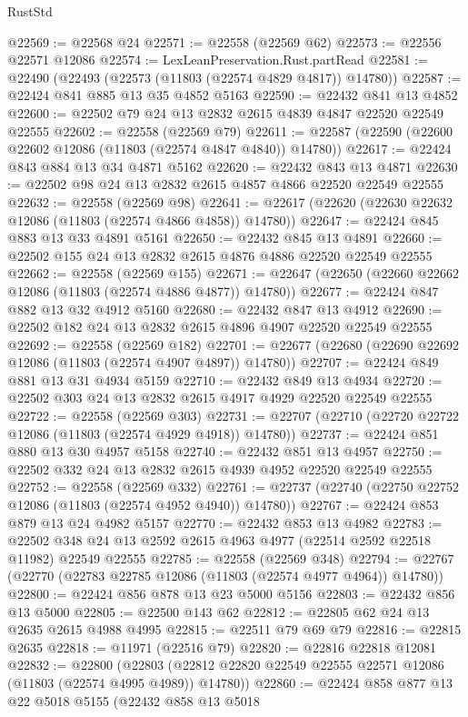\begin{lexlean}{RustStd}
\begin{coremodule}
@22569 := @22568 @24
@22571 := @22558 (@22569 @62)
@22573 := @22556 @22571 @12086
@22574 := LexLeanPreservation.Rust.partRead
@22581 := @22490 (@22493 (@22573 (@11803 (@22574 @4829 @4817)) @14780))
@22587 := @22424 @841 @885 @13 @35 @4852 @5163
@22590 := @22432 @841 @13 @4852
@22600 := @22502 @79 @24 @13 @2832 @2615 @4839 @4847 @22520 @22549 @22555
@22602 := @22558 (@22569 @79)
@22611 := @22587 (@22590 (@22600 @22602 @12086 (@11803 (@22574 @4847 @4840)) @14780))
@22617 := @22424 @843 @884 @13 @34 @4871 @5162
@22620 := @22432 @843 @13 @4871
@22630 := @22502 @98 @24 @13 @2832 @2615 @4857 @4866 @22520 @22549 @22555
@22632 := @22558 (@22569 @98)
@22641 := @22617 (@22620 (@22630 @22632 @12086 (@11803 (@22574 @4866 @4858)) @14780))
@22647 := @22424 @845 @883 @13 @33 @4891 @5161
@22650 := @22432 @845 @13 @4891
@22660 := @22502 @155 @24 @13 @2832 @2615 @4876 @4886 @22520 @22549 @22555
@22662 := @22558 (@22569 @155)
@22671 := @22647 (@22650 (@22660 @22662 @12086 (@11803 (@22574 @4886 @4877)) @14780))
@22677 := @22424 @847 @882 @13 @32 @4912 @5160
@22680 := @22432 @847 @13 @4912
@22690 := @22502 @182 @24 @13 @2832 @2615 @4896 @4907 @22520 @22549 @22555
@22692 := @22558 (@22569 @182)
@22701 := @22677 (@22680 (@22690 @22692 @12086 (@11803 (@22574 @4907 @4897)) @14780))
@22707 := @22424 @849 @881 @13 @31 @4934 @5159
@22710 := @22432 @849 @13 @4934
@22720 := @22502 @303 @24 @13 @2832 @2615 @4917 @4929 @22520 @22549 @22555
@22722 := @22558 (@22569 @303)
@22731 := @22707 (@22710 (@22720 @22722 @12086 (@11803 (@22574 @4929 @4918)) @14780))
@22737 := @22424 @851 @880 @13 @30 @4957 @5158
@22740 := @22432 @851 @13 @4957
@22750 := @22502 @332 @24 @13 @2832 @2615 @4939 @4952 @22520 @22549 @22555
@22752 := @22558 (@22569 @332)
@22761 := @22737 (@22740 (@22750 @22752 @12086 (@11803 (@22574 @4952 @4940)) @14780))
@22767 := @22424 @853 @879 @13 @24 @4982 @5157
@22770 := @22432 @853 @13 @4982
@22783 := @22502 @348 @24 @13 @2592 @2615 @4963 @4977 (@22514 @2592 @22518 @11982) @22549 @22555
@22785 := @22558 (@22569 @348)
@22794 := @22767 (@22770 (@22783 @22785 @12086 (@11803 (@22574 @4977 @4964)) @14780))
@22800 := @22424 @856 @878 @13 @23 @5000 @5156
@22803 := @22432 @856 @13 @5000
@22805 := @22500 @143 @62
@22812 := @22805 @62 @24 @13 @2635 @2615 @4988 @4995
@22815 := @22511 @79 @69 @79
@22816 := @22815 @2635
@22818 := @11971 (@22516 @79)
@22820 := @22816 @22818 @12081
@22832 := @22800
    (@22803 (@22812 @22820 @22549 @22555 @22571 @12086 (@11803 (@22574 @4995 @4989)) @14780))
@22860 := @22424
    @858
    @877
    @13
    @22
    @5018
    @5155
    (@22432
      @858
      @13
      @5018

\end{coremodule}
\end{lexlean}
